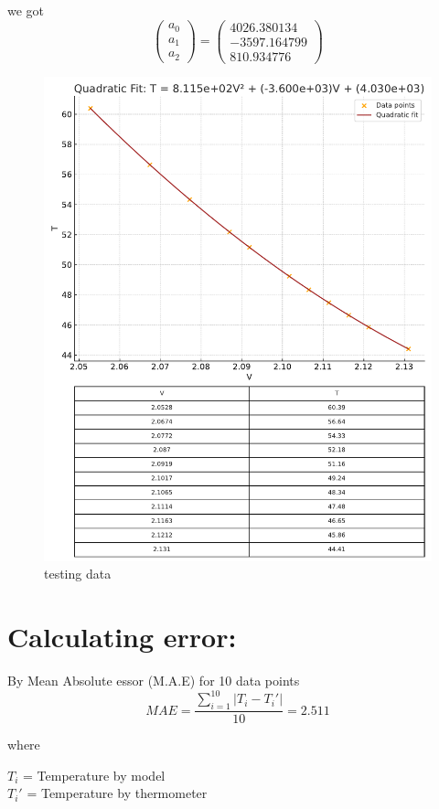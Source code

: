 \documentclass[journal]{IEEEtran}
\begin{document}
we got
\[
\begin{pmatrix}
a_0 \\
a_1 \\
a_2
\end{pmatrix}
=
\begin{pmatrix}
4026.380134 \\
-3597.164799 \\
810.934776
\end{pmatrix}
\]
\begin{figure}[h]
    \centering
    \includegraphics[width=0.9\linewidth]{figs/testing data.pdf}
    \caption{testing data}
    \label{fig:placeholder}
\end{figure}
\newpage
\section*{Calculating error:}

By Mean Absolute essor (M.A.E) for 10 data points
\[
MAE = \frac{\sum_{i=1}^{10} |T_i - T_i'|}{10}=2.511
\]

where

$T_i$ = Temperature by model \\
$T_i'$ = Temperature by thermometer
\end{document}
